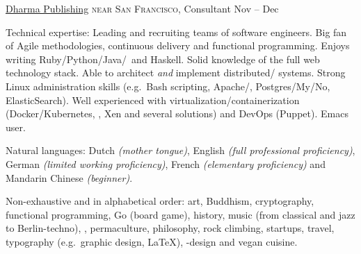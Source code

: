 \documentclass[10pt,a4paper]{article}
\begin{document}
\headedsection
  {\href{http://www.dharmapublishing.com}{Dharma Publishing}}
  {\textsc{near San Francisco, }} {%
  \headedsubsection
    { Consultant}
    {Nov  -- Dec }
    {}
}

\spacedhrule{-0.2em}{-0.4em}



\inlineheadsection  %
  {Technical expertise:}
  {Leading and recruiting teams of software engineers.  Big fan of Agile methodologies, continuous delivery and functional programming.  Enjoys writing Ruby/\nsp Python/\nsp Java/\nsp \CPP~and Haskell.  Solid knowledge of the full web technology stack.  Able to architect \textit{and} implement distributed/ systems.  Strong Linux administration skills (e.g.\ Bash scripting, Apache/, Postgres/My/No, ElasticSearch).  Well experienced with virtualization/containerization (Docker/Kubernetes, , Xen and several  solutions) and DevOps (Puppet).  Emacs user.}

\vspace{0.5em}
\inlineheadsection
  {Natural languages:}
  {Dutch \emph{(mother tongue)}, English \emph{(full professional proficiency)}, German \emph{(limited working proficiency)}, French \emph{(elementary proficiency)} and Mandarin Chinese \emph{(beginner)}.}


\spacedhrule{1.6em}{-0.4em}


\inlineheadsection
  {Non-exhaustive and in alphabetical order:}
  {art, Buddhism, cryptography, functional programming, Go (board game), history, music (from classical and jazz to Berlin-techno), , permaculture, philosophy, rock climbing, startups, travel, typography (e.g.\ graphic design, \LaTeX), -design and vegan cuisine.}
\end{document}
